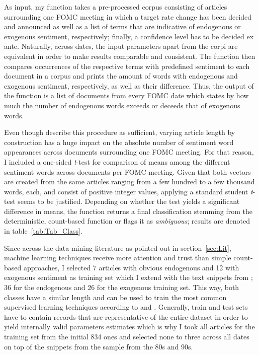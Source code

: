 As input, my function takes a pre-processed corpus consisting of articles surrounding one FOMC meeting in which a target rate change has been decided and announced as well as a list of terms that are indicative of endogenous or exogenous sentiment, respectively; finally, a confidence level has to be decided ex ante. Naturally, across dates, the input parameters apart from the corpi are equivalent in order to make results comparable and consistent. The function then compares occurrences of the respective terms with predefined sentiment to each document in a corpus and prints the amount of words with endogenous and exogenous sentiment, respectively, as well as their difference. Thus, the output of the function is a list of documents from every FOMC date which states by how much the number of endogenous words exceeds or deceeds that of exogenous words. 

Even though \textcite{Meyer.2008} describe this procedure as sufficient, varying article length by construction has a huge impact on the absolute number of sentiment word appearances across documents surrounding one FOMC meeting. For that reason, I included a one-sided \textit{t}-test for comparison of means among the different sentiment words across documents per FOMC meeting. Given that both vectors are created from the same articles ranging from a few hundred to a few thousand words, each, and consist of positive integer values, applying a standard student \textit{t}-test seems to be justified. Depending on whether the test yields a significant difference in means, the function returns a final classification stemming from the deterministic, count-based function or flags it as \textit{ambiguous}; results are denoted in table~\vref{tab:Tab_Class}.

Since across the data mining literature as pointed out in section~\ref{sec:Lit}, machine learning techniques receive more attention and trust than simple count-based approaches, I selected 7 articles with obvious endogenous and 12 with exogenous sentiment as training set which I extend with the text snippets from \textcite{Ellingsen.2003}; 36 for the endogenous and 26 for the exogenous training set. This way, both classes have a similar length and can be used to train the most common supervised learning techniques according to \textcite{Liu.2010} and \textcite{Feldman.2013}. Generally, train and test sets have to contain records that are representative of the entire dataset in order to yield internally valid parameters estimates which is why I took all articles for the training set from the initial 834 ones and selected none to three across all dates on top of the snippets from the \textcite{Ellingsen.2003} sample from the 80s and 90s.

